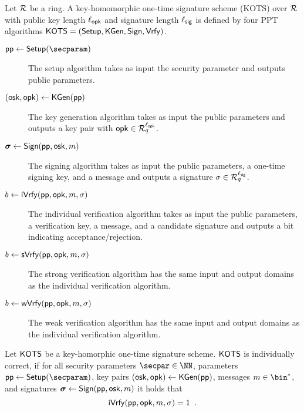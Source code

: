 \begin{definition}\label{def:hots}
  Let $\mathcal{R}$ be a ring.
  A key-homomorphic one-time signature scheme (KOTS) over $\mathcal{R}$ with public key length ${\ell_{\mathsf{opk}}}$ and signature length ${\ell_{\mathsf{sig}}}$ is defined by four PPT algorithms $\mathsf{KOTS}=(\mathsf{Setup},\mathsf{KGen},\mathsf{Sign},\mathsf{Vrfy})$.
  \begin{description}
    \item[$\params\gets\setup(\secparam)$] The setup algorithm takes as input the security parameter and outputs public parameters.
    \item[$(\mathsf{osk},\mathsf{opk}) \gets \mathsf{KGen}(\mathsf{pp})$] The key generation algorithm takes as input the public parameters and outputs a key pair with $\mathsf{opk}\in\mathcal{R}_q^{\ell_{\mathsf{opk}}}$.
    \item[$\boldsymbol{\sigma} \gets \mathsf{Sign}(\mathsf{pp},\mathsf{osk},m)$] The signing algorithm takes as input the public parameters, a one-time signing key, and a message and outputs a signature $\sigma\in\mathcal{R}_q^{\ell_{\mathsf{sig}}}$.
    \item[$b\gets \mathsf{iVrfy}(\mathsf{pp},\mathsf{opk},m,\sigma)$] The individual verification algorithm takes as input the public parameters, a verification key, a message, and a candidate signature and outputs a bit indicating acceptance/rejection.
    \item[$b\gets \mathsf{sVrfy}(\mathsf{pp},\mathsf{opk},m,\sigma)$] The strong verification algorithm has the same input and output domains as the individual verification algorithm.
    \item[$b\gets \mathsf{wVrfy}(\mathsf{pp},\mathsf{opk},m,\sigma)$] The weak verification algorithm has the same input and output domains as the individual verification algorithm.
  \end{description}
\end{definition}
\begin{definition}
Let $\mathsf{KOTS}$ be a key-homorphic one-time signature scheme.
$\mathsf{KOTS}$ is individually correct, if for all security parameters $\secpar\in\NN$, parameters $\params \gets \setup(\secparam)$, key pairs $(\mathsf{osk},\mathsf{opk}) \gets \mathsf{KGen}(\mathsf{pp})$, messages $m\in\bin^*$, and signatures $\boldsymbol{\sigma} \gets \mathsf{Sign}(\mathsf{pp},\mathsf{osk},m)$ it holds that
\[
  \mathsf{iVrfy}(\mathsf{pp},\mathsf{opk},m,\sigma)=1\enspace.
\]
\end{definition}

